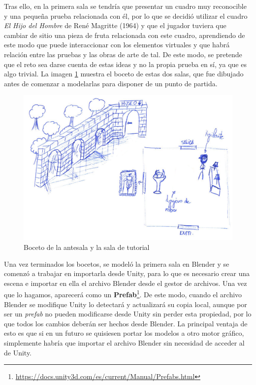 Tras ello, en la primera sala se tendría que presentar un cuadro muy reconocible y una pequeña prueba relacionada con él, por lo que se decidió utilizar el cuadro \textit{El Hijo del Hombre} de René Magritte (1964) y que el jugador tuviera que cambiar de sitio una pieza de fruta relacionada con este cuadro, aprendiendo de este modo que puede interaccionar con los elementos virtuales y que habrá relación entre las pruebas y las obras de arte de tal. De este modo, se pretende que el reto sea darse cuenta de estas ideas y no la propia prueba en sí, ya que es algo trivial. La imagen \ref{fig:bocetos-salas-0-1} muestra el boceto de estas dos salas, que fue dibujado antes de comenzar a modelarlas para disponer de un punto de partida.

\begin{figure}[!h]
\begin{center}
\includegraphics[width=.8\textwidth]{imagenes/7/bocetos/boceto-sala-0-1.png}
\caption{Boceto de la antesala y la sala de tutorial}
\label{fig:bocetos-salas-0-1}
\end{center}
\end{figure}

Una vez terminados los bocetos, se modeló la primera sala en Blender y se comenzó a trabajar en importarla desde Unity, para lo que es necesario crear una escena e importar en ella el archivo Blender desde el gestor de archivos. Una vez que lo hagamos, aparecerá como un \textbf{Prefab}\footnote{\url{https://docs.unity3d.com/es/current/Manual/Prefabs.html}}. De este modo, cuando el archivo Blender se modifique Unity lo detectará y actualizará su copia local, aunque por ser un \textit{prefab} no pueden modificarse desde Unity sin perder esta propiedad, por lo que todos los cambios deberán ser hechos desde Blender. La principal ventaja de esto es que si en un futuro se quisiesen portar los modelos a otro motor gráfico, simplemente habría que importar el archivo Blender sin necesidad de acceder al de Unity.

